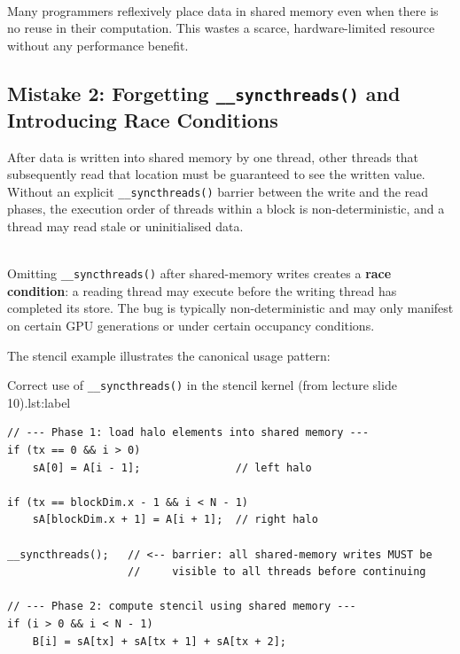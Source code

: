 \begin{pppitfall}
  \\Many programmers reflexively place data in shared memory even when there is
  no reuse in their computation. This wastes a scarce, hardware-limited
  resource without any performance benefit.
\end{pppitfall}

\subsection{Mistake 2: Forgetting \texttt{\_\_syncthreads()} and Introducing
Race Conditions}
\label{subsec:forgotten-sync}

After data is written into shared memory by one thread, other threads that
subsequently read that location must be guaranteed to see the written value.
Without an explicit \texttt{\_\_syncthreads()} barrier between the write and
the read phases, the execution order of threads within a block is
non-deterministic, and a thread may read stale or uninitialised data.

\begin{pppitfall}
  \\Omitting \texttt{\_\_syncthreads()} after shared-memory writes creates a
  \textbf{race condition}: a reading thread may execute before the writing
  thread has completed its store. The bug is typically non-deterministic and
  may only manifest on certain GPU generations or under certain occupancy
  conditions.
\end{pppitfall}

The stencil example illustrates the canonical usage pattern:

\begin{ppprogram}{Correct use of \texttt{\_\_syncthreads()} in the
stencil kernel (from lecture slide 10).}{lst:label}
\begin{lstlisting}
// --- Phase 1: load halo elements into shared memory ---
if (tx == 0 && i > 0)
    sA[0] = A[i - 1];               // left halo

if (tx == blockDim.x - 1 && i < N - 1)
    sA[blockDim.x + 1] = A[i + 1];  // right halo

__syncthreads();   // <-- barrier: all shared-memory writes MUST be
                   //     visible to all threads before continuing

// --- Phase 2: compute stencil using shared memory ---
if (i > 0 && i < N - 1)
    B[i] = sA[tx] + sA[tx + 1] + sA[tx + 2];
\end{lstlisting}
\end{ppprogram}

